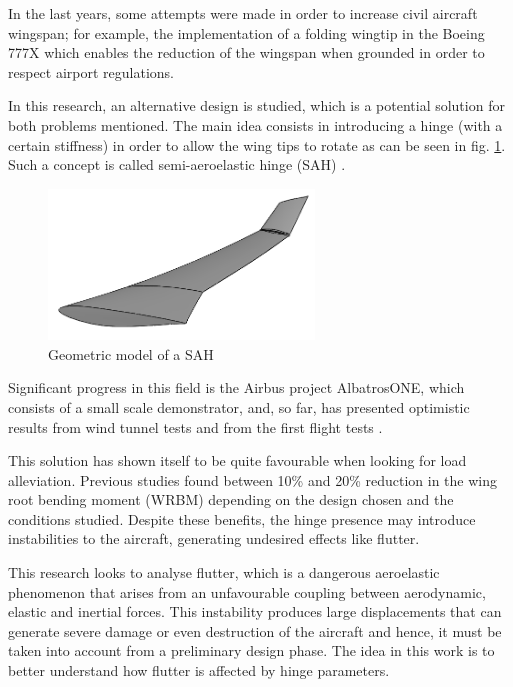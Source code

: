 \documentclass[conference]{IEEEtran}
\newlength\figureheight
\newlength\figurewidth
\begin{document}
In the last years, some attempts were made in order to increase civil aircraft wingspan; for example, the implementation of a folding wingtip in the Boeing 777X which enables the reduction of the wingspan when grounded in order to respect airport regulations.

In this research, an alternative design is studied, which is a potential solution for both problems mentioned. The main idea consists in introducing a hinge (with a certain stiffness) in order to allow the wing tips to rotate as can be seen in fig. \ref{fig:HingedWing}. Such a concept is called semi-aeroelastic hinge (SAH) \cite{Castrichini2016,Castrichini2020}. 

\begin{figure}[htp]
  \centering
  \setlength\figureheight{5cm}
  \setlength\figurewidth{6cm}
  \includegraphics[width=200pt]{images/HingedWing.png}
  \caption{Geometric model of a SAH}
  \label{fig:HingedWing}
\end{figure}

Significant progress in this field is the Airbus project AlbatrosONE, which consists of a small scale demonstrator, and, so far, has presented optimistic results from wind tunnel tests and from the first flight tests \cite{wilson2019small}.

This solution has shown itself to be quite favourable when looking for load alleviation. Previous studies found between 10\% and 20\% reduction in the wing root bending moment (WRBM) depending on the design chosen and the conditions studied. Despite these benefits, the hinge presence may introduce instabilities to the aircraft, generating undesired effects like flutter.

This research looks to analyse flutter, which is a dangerous aeroelastic phenomenon that arises from an unfavourable coupling between aerodynamic, elastic and inertial forces. This instability produces large displacements that can generate severe damage or even destruction of the aircraft and hence, it must be taken into account from a preliminary design phase. The idea in this work is to better understand how flutter is affected by hinge parameters.
\end{document}
